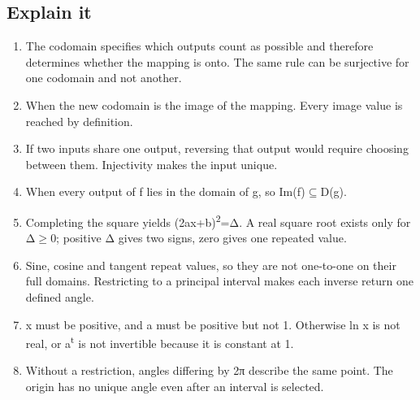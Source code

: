 \documentclass[11pt]{article}
\begin{document}
\begin{keepsection}\subsection{Explain it}

\begin{enumerate}
\item The codomain specifies which outputs count as possible and therefore determines whether the mapping is onto. The same rule can be surjective for one codomain and not another.
\item When the new codomain is the image of the mapping. Every image value is reached by definition.
\item If two inputs share one output, reversing that output would require choosing between them. Injectivity makes the input unique.
\item When every output of f lies in the domain of g, so Im(f)\ensuremath{\subseteq}D(g).
\item Completing the square yields (2ax+b)\textsuperscript{2}=Δ. A real square root exists only for Δ\ensuremath{\geq}0; positive Δ gives two signs, zero gives one repeated value.
\item Sine, cosine and tangent repeat values, so they are not one-to-one on their full domains. Restricting to a principal interval makes each inverse return one defined angle.
\item x must be positive, and a must be positive but not 1. Otherwise ln x is not real, or a\textsuperscript{t} is not invertible because it is constant at 1.
\item Without a restriction, angles differing by 2π describe the same point. The origin has no unique angle even after an interval is selected.
\end{enumerate}

\end{keepsection}
\end{document}
